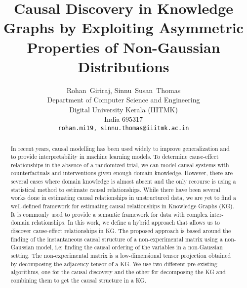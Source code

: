 \documentclass{article}
\title{Causal Discovery in Knowledge Graphs by Exploiting Asymmetric Properties of Non-Gaussian Distributions}
\author{%
  Rohan~Giriraj, Sinnu~Susan~Thomas\\
  Department of Computer Science and Engineering\\
  Digital University Kerala (IIITMK)\\
  India 695317 \\
  \texttt{rohan.mi19, sinnu.thomas@iiitmk.ac.in} \\
}
\begin{document}
\maketitle

\begin{abstract}

In recent years, causal modelling has been used widely to improve generalization and to provide interpretability in machine learning models. To determine cause-effect relationships in the absence of a randomized trial, we can model causal systems with counterfactuals and interventions given enough domain knowledge. However, there are several cases where domain knowledge is almost absent and the only recourse is using a statistical method to estimate causal relationships. While there have been several works done in estimating causal relationships in unstructured data, we are yet to find a well-defined framework for estimating causal relationships in Knowledge Graphs (KG). It is commonly used to provide a semantic framework for data with complex inter-domain relationships. In this work, we define a hybrid approach that allows us to discover cause-effect relationships in KG. The proposed approach is based around the finding of the instantaneous causal structure of a non-experimental matrix using a non-Gaussian model, i.e; finding the causal ordering of the variables in a non-Gaussian setting. The non-experimental matrix is a low-dimensional tensor projection obtained by decomposing the adjacency tensor of a KG. We use two different pre-existing algorithms, one for the causal discovery and the other for decomposing the KG and combining them to get the causal structure in a KG. 
\end{abstract}
\end{document}
